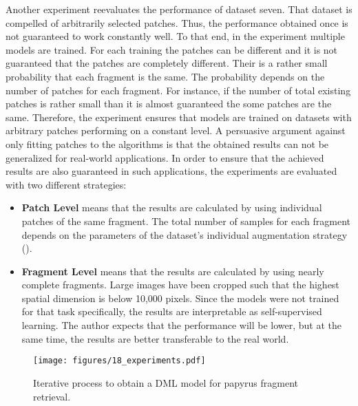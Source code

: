 \noindent Another experiment reevaluates the performance of dataset seven. That dataset is compelled of arbitrarily selected patches. Thus, the performance obtained once is not guaranteed to work constantly well. To that end, in the experiment multiple models are trained. For each training the patches can be different and it is not guaranteed that the patches are completely different. Their is a rather small probability that each fragment is the same. The probability depends on the number of patches for each fragment. For instance, if the number of total existing patches is rather small than it is almost guaranteed the some patches are the same. Therefore, the experiment ensures that models are trained on datasets with arbitrary patches performing on a constant level. A persuasive argument against only fitting patches to the  algorithms is that the obtained results can not be generalized for real-world applications. In order to ensure that the achieved results are also guaranteed in such applications, the experiments are evaluated with two different strategies:
%
\begin{itemize}
	\item \textbf{Patch Level} means that the results are calculated by using individual patches of the same fragment. The total number of samples for each fragment depends on the parameters of the dataset's individual augmentation strategy ().
	\item \textbf{Fragment Level} means that the results are calculated by using nearly complete fragments. Large images have been cropped such that the highest spatial dimension is below 10,000 pixels. Since the models were not trained for that task specifically, the results are interpretable as self-supervised learning. The author expects that the performance will be lower, but at the same time, the results are better transferable to the real world.
\end{itemize}
%
\begin{figure}[t]
	\centering
	\texttt{[image: figures/18\_experiments.pdf]}
	\caption{Iterative process to obtain a DML model for papyrus fragment retrieval.}
	\label{fig:experiments}
\end{figure} 
%
